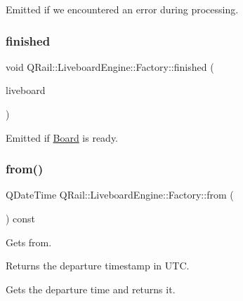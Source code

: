 Emitted if we encountered an error during processing. 

\mbox{\label{classQRail_1_1LiveboardEngine_1_1Factory_a3a429744d6ed2685d62fe554dd2e84cb}} 
\subsubsection{\texorpdfstring{finished}{finished}}
{\footnotesize\ttfamily void Q\+Rail\+::\+Liveboard\+Engine\+::\+Factory\+::finished (\begin{DoxyParamCaption}\item[{\mbox{\hyperlink{classQRail_1_1LiveboardEngine_1_1Board}{Q\+Rail\+::\+Liveboard\+Engine\+::\+Board}} $\ast$}]{liveboard }\end{DoxyParamCaption})\hspace{0.3cm}{\ttfamily [signal]}}



Emitted if \mbox{\hyperlink{classQRail_1_1LiveboardEngine_1_1Board}{Board}} is ready. 

\mbox{\label{classQRail_1_1LiveboardEngine_1_1Factory_a883b4e0b9af113d312c6828b64d07258}} 
\subsubsection{\texorpdfstring{from()}{from()}}
{\footnotesize\ttfamily Q\+Date\+Time Q\+Rail\+::\+Liveboard\+Engine\+::\+Factory\+::from (\begin{DoxyParamCaption}{ }\end{DoxyParamCaption}) const}



Gets from. 

\begin{DoxyReturn}{Returns}
the departure timestamp in U\+TC.
\end{DoxyReturn}
Gets the departure time and returns it. \mbox{\label{classQRail_1_1LiveboardEngine_1_1Factory_a32f0025c70c2c793d66208f558a7a355}} 

